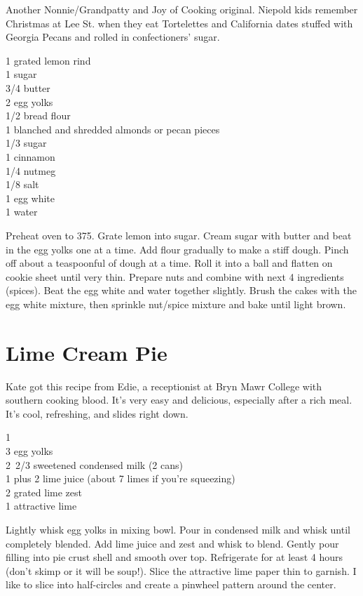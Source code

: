 \begin{open}
  Another Nonnie/Grandpatty and Joy of Cooking original. Niepold kids remember Christmas at Lee St. when they eat Tortelettes and California dates stuffed with Georgia Pecans and rolled in confectioners' sugar.
\end{open}
\begin{ingredients}
  1 grated lemon rind\\
  \SI{1}{\cup} sugar\\
  \SI{3/4}{\cup} butter\\
  2 egg yolks \\
  \SI{1/2}{\cup} bread flour \\
  \SI{1}{\cup} blanched and shredded almonds or pecan pieces \\
  \SI{1/3}{\cup} sugar \\
  \SI{1}{\teaspoon} cinnamon\\
  \SI{1/4}{\teaspoon} nutmeg\\
  \SI{1/8}{\teaspoon} salt\\
  1 egg white\\
  \SI{1}{\tblspoon} water
\end{ingredients}
Preheat oven to \SI{375}{\degreeF}. Grate lemon into sugar. Cream sugar with butter and beat in the egg yolks one at a time. Add flour gradually to make a stiff dough. Pinch off about a teaspoonful of dough at a time. Roll it into a
ball and flatten on cookie sheet until very thin. Prepare nuts and combine with next 4 ingredients (spices). Beat the egg white and water together slightly.  Brush the cakes with the egg white mixture, then sprinkle nut/spice mixture and bake until light brown.

\section{Lime Cream Pie}

\begin{open}
  Kate got this recipe from Edie, a receptionist at Bryn Mawr College with southern cooking blood.  It's very easy and delicious, especially after a rich meal. It's cool, refreshing, and slides right down.
\end{open}
\begin{ingredients}
  1 \\
  3 egg yolks\\
  \SI{2/3}[2]{\cup} sweetened condensed milk (2 cans)\\
  \SI{1}{\cup} plus \SI{2}{\tblspoon} lime juice (about 7 limes if you're
  squeezing)\\
  \SI{2}{\teaspoon} grated lime zest\\
  1 attractive lime
\end{ingredients}
Lightly whisk egg yolks in mixing bowl. Pour in condensed milk and whisk until
completely blended.  Add lime juice and zest and whisk to blend. Gently pour
filling into pie crust shell and smooth over top.  Refrigerate for at least 4
hours (don't skimp or it will be soup!). Slice the attractive lime paper thin
to garnish. I like to slice into half-circles and create a pinwheel pattern
around the center.
